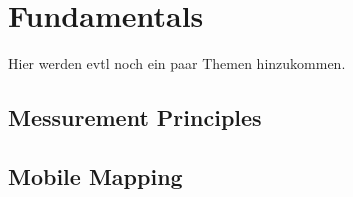 \chapter{Fundamentals}\label{ch:fundamentals}
Hier werden evtl noch ein paar Themen hinzukommen.
\section{Messurement Principles}\label{sec:messurementPrinciples}
\section{Mobile Mapping}\label{sec:mobileMapping}

